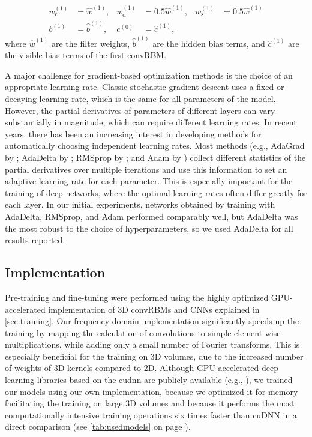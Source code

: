 \begin{align}
w_{\text{c}}^{(1)} &= \hat{w}^{(1)}, &
w_{\text{d}}^{(1)} &= 0.5\hat{w}^{(1)}, &
w_{\text{s}}^{(1)} &= 0.5\hat{w}^{(1)} \\
b^{(1)} &= \hat{b}^{(1)}, &
c^{(0)} &= \hat{c}^{(1)},
\end{align}
where $\hat{w}^{(1)}$ are the filter weights, $\hat{b}^{(1)}$ are the hidden
bias terms, and $\hat{c}^{(1)}$ are the visible bias terms of the first convRBM.

A major challenge for gradient-based optimization methods is the choice of an
appropriate learning rate. Classic stochastic gradient descent \citep{lecun1998}
uses a fixed or decaying learning rate, which is the same for all parameters of
the model. However, the partial derivatives of parameters of different layers
can vary substantially in magnitude, which can require different learning rates.
In recent years, there has been an increasing interest in developing methods for
automatically choosing independent learning rates. Most methods (e.g., AdaGrad
by \citealp{duchi2011}; AdaDelta by \citealp{zeiler2012};
RMSprop by \citealp{dauphin2015}; and Adam by \citealp{kingma2014})
collect different statistics of the partial derivatives over multiple iterations
and use this information to set an adaptive learning rate for each parameter.
This is especially important for the training of deep networks, where the
optimal learning rates often differ greatly for each layer. In our initial
experiments, networks obtained by training with AdaDelta, RMSprop, and Adam
performed comparably well, but AdaDelta was the most robust to the choice of
hyperparameters, so we used AdaDelta for all results reported.

\subsection{Implementation}


Pre-training and fine-tuning were performed using the highly optimized
GPU-accelerated implementation of 3D convRBMs and CNNs
\citep{brosch2015efficient} explained in \ref{sec:training}. Our frequency
domain implementation significantly speeds up the training by mapping the
calculation of convolutions to simple element-wise multiplications, while adding
only a small number of Fourier transforms. This is especially beneficial for the
training on 3D volumes, due to the increased number of weights of 3D kernels
compared to 2D. Although GPU-accelerated deep learning libraries based on the
\gls{cudnn} \citep{chetlur2014} are publicly available (e.g.,
\citealp{jia2014,bastien2012,collobert2011torch7}), we trained our models using
our own implementation, because we optimized it for memory facilitating the
training on large 3D volumes and because it performs the most computationally
intensive training operations six times faster than cuDNN in a direct comparison
(see \ref{tab:usedmodels} on page \pageref{tab:usedmodels}).
 
